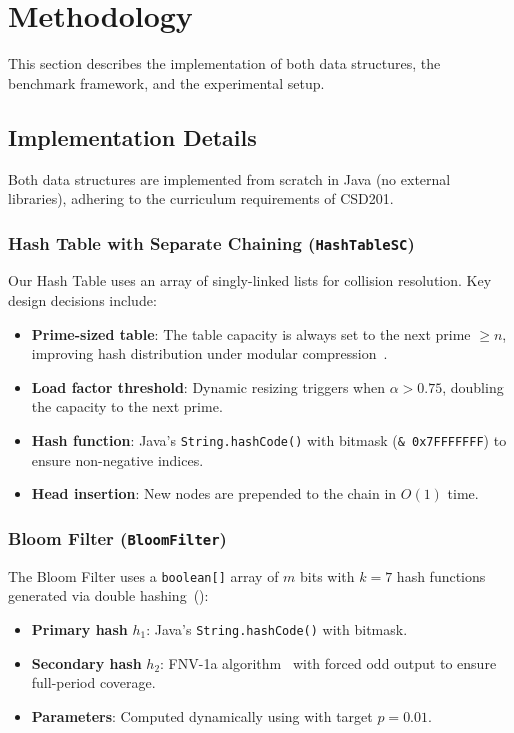 \section{Methodology}
\label{sec:methodology}

This section describes the implementation of both data structures, the benchmark framework, and the experimental setup.

\subsection{Implementation Details}
\label{subsec:implementation}

Both data structures are implemented from scratch in Java (no external libraries), adhering to the curriculum requirements of CSD201.

\subsubsection{Hash Table with Separate Chaining (\texttt{HashTableSC})}

Our Hash Table uses an array of singly-linked lists for collision resolution. Key design decisions include:
\begin{itemize}[nosep]
    \item \textbf{Prime-sized table}: The table capacity is always set to the next prime $\geq n$, improving hash distribution under modular compression~\citep{cormen2022}.
    \item \textbf{Load factor threshold}: Dynamic resizing triggers when $\alpha > 0.75$, doubling the capacity to the next prime.
    \item \textbf{Hash function}: Java's \texttt{String.hashCode()} with bitmask (\texttt{\& 0x7FFFFFFF}) to ensure non-negative indices.
    \item \textbf{Head insertion}: New nodes are prepended to the chain in $O(1)$ time.
\end{itemize}

\subsubsection{Bloom Filter (\texttt{BloomFilter})}

The Bloom Filter uses a \texttt{boolean[]} array of $m$ bits with $k = 7$ hash functions generated via double hashing~():
\begin{itemize}[nosep]
    \item \textbf{Primary hash} $h_1$: Java's \texttt{String.hashCode()} with bitmask.
    \item \textbf{Secondary hash} $h_2$: FNV-1a algorithm~\citep{carter1979} with forced odd output to ensure full-period coverage.
    \item \textbf{Parameters}: Computed dynamically using  with target $p = 0.01$.
\end{itemize}

